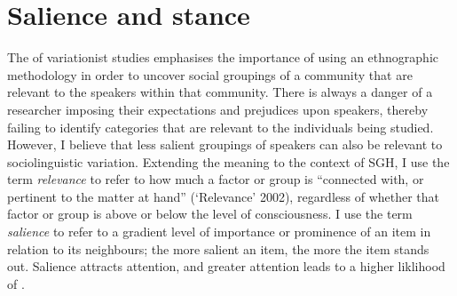 \section{Salience and stance}\label{sec:salience}
The  of variationist studies emphasises the importance of using an ethnographic methodology in order to uncover social groupings of a community that are relevant to the speakers within that community. There is always a danger of a researcher imposing their expectations and prejudices upon speakers, thereby failing to identify categories that are relevant to the individuals being studied. However, I believe that less salient groupings of speakers can also be relevant to sociolinguistic variation. Extending the meaning to the context of SGH, I use the term \textit{relevance} to refer to how much a factor or group is ``connected with, or pertinent to the matter at hand'' (`Relevance' 2002), regardless of whether that factor or group is above or below the level of consciousness. I use the term \textit{salience} to refer to a gradient level of importance or prominence of an item in relation to its neighbours; the more salient an item, the more the item stands out. Salience attracts attention, and greater attention leads to a higher liklihood of .

